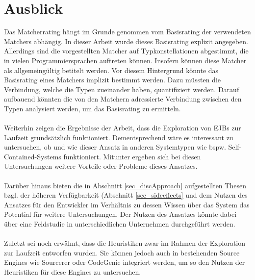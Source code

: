 \section{Ausblick}
Das Matcherrating hängt im Grunde genommen vom Basisrating der verwendeten Matchers abhängig. In dieser Arbeit wurde dieses Basisrating explizit angegeben. Allerdings sind die vorgestellten Matcher auf Typkonstellationen abgestimmt, die in vielen Programmiersprachen auftreten können. Insofern können diese Matcher als allgemeingültig betitelt werden. Vor diesem Hintergrund könnte das Basisrating eines Matchers implizit bestimmt werden. Dazu müssten die Verbindung, welche die Typen zueinander haben, quantifiziert werden. Darauf aufbauend könnten die von den Matchern adressierte Verbindung zwischen den Typen analysiert werden, um das Basisrating zu ermitteln.
\\\\
Weiterhin zeigen die Ergebnisse der Arbeit, dass die Exploration von EJBs zur Laufzeit grundsätzlich funktioniert. Dementsprechend wäre es interessant zu untersuchen, ob und wie dieser Ansatz in anderen Systemtypen wie bspw. Self-Contained-Systems funktioniert. Mitunter ergeben sich bei diesen Untersuchungen weitere Vorteile oder Probleme dieses Ansatzes.
\\\\
Darüber hinaus bieten die in Abschnitt \ref{sec_discApproach} aufgestellten Thesen bzgl. der höheren Verfügbarkeit (Abschnitt \ref{sec_sideeffects} und dem Nutzen des Ansatzes für den Entwickler im Verhältnis zu dessen Wissen über das System das Potential für weitere Untersuchungen. Der Nutzen des Ansatzes könnte dabei über eine Feldstudie in unterschiedlichen Unternehmen durchgeführt werden.
\\\\
Zuletzt sei noch erwähnt, dass die Heuristiken zwar im Rahmen der Exploration zur Laufzeit entworfen wurden. Sie können jedoch auch in bestehenden Source Engines wie Sourcerer oder CodeGenie integriert werden, um so den Nutzen der Heuristiken für diese Engines zu untersuchen.
